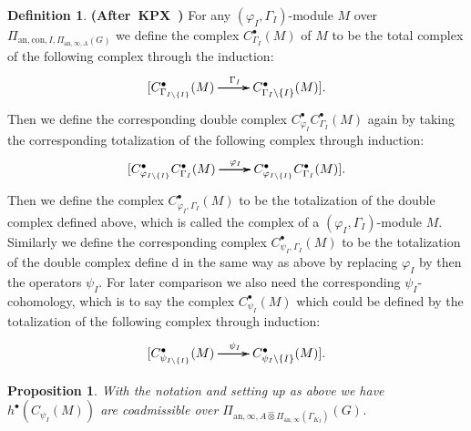 \documentclass[12pt]{amsart}
\newtheorem{proposition}[theorem]{Proposition}
\theoremstyle{definition}
\newtheorem{definition}[theorem]{Definition}
\numberwithin{equation}{section}
\begin{document}
\begin{definition} \mbox{\bf{(After KPX \cite[2.3]{KPX})}}
For any $(\varphi_I,\Gamma_I)$-module $M$ over $\Pi_{\mathrm{an},\mathrm{con},I,\Pi_{\mathrm{an},\infty,A}(G)}$ we define the complex $C^\bullet_{\Gamma_I}(M)$ of $M$ to be the total complex of the following complex through the induction:
\[
\xymatrix@R+0pc@C+0pc{
[ C^\bullet_{\Gamma_{I\backslash\{I\}}}(M) \ar[r]^{\Gamma_I} \ar[r] \ar[r]  & C^\bullet_{\Gamma_I\backslash\{I\}}(M)]
.}
\]
Then we define the corresponding double complex $C^\bullet_{\varphi_I}C^\bullet_{\Gamma_I}(M)$ again by taking the corresponding totalization of the following complex through induction:
\[
\xymatrix@R+0pc@C+0pc{
[C^\bullet_{\varphi_{I\backslash\{I\}}}C^\bullet_{\Gamma_{I}}(M) \ar[r]^{\varphi_I} \ar[r] \ar[r]  & C^\bullet_{\varphi_{I\backslash\{I\}}}C^\bullet_{\Gamma_I}(M)]
.}
\]
Then we define the complex $C^\bullet_{\varphi_I,\Gamma_I}(M)$ to be the totalization of the double complex defined above, which is called the complex of a $(\varphi_I,\Gamma_I)$-module $M$. Similarly we define the corresponding complex $C^\bullet_{\psi_I,\Gamma_I}(M)$ to be the totalization of the double complex define  d in the same way as above by replacing $\varphi_I$ by then the operators $\psi_I$. For later comparison we also need the corresponding $\psi_I$-cohomology, which is to say the complex $C^\bullet_{\psi_I}(M)$ which could be defined by the totalization of the following complex through induction:
\[
\xymatrix@R+0pc@C+0pc{
[ C^\bullet_{\psi_{I\backslash\{I\}}}(M) \ar[r]^{\psi_I} \ar[r] \ar[r]  & C^\bullet_{\psi_I\backslash\{I\}}(M)]
.}
\]
\end{definition} 






\begin{proposition} 
With the notation and setting up as above we have $h^\bullet(C_{\psi_I}(M))$ are coadmissible over $\Pi_{\mathrm{an},\infty,A \widehat{\otimes} \Pi_{\mathrm{an},\infty}(\Gamma_{K_I})}(G)$. 	
\end{proposition}
\end{document}
